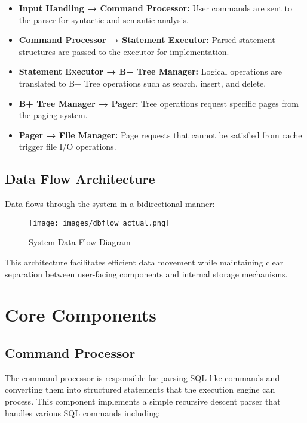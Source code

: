 \documentclass[12pt,a4paper]{article}  %
\begin{document}
\begin{mdframed}[linecolor=uetblue, linewidth=1pt, backgroundcolor=lightgray, roundcorner=10pt, innerleftmargin=10pt, innerrightmargin=10pt]
\begin{itemize}
    \item \textbf{Input Handling → Command Processor:} User commands are sent to the parser for syntactic and semantic analysis.
    
    \item \textbf{Command Processor → Statement Executor:} Parsed statement structures are passed to the executor for implementation.
    
    \item \textbf{Statement Executor → B+ Tree Manager:} Logical operations are translated to B+ Tree operations such as search, insert, and delete.
    
    \item \textbf{B+ Tree Manager → Pager:} Tree operations request specific pages from the paging system.
    
    \item \textbf{Pager → File Manager:} Page requests that cannot be satisfied from cache trigger file I/O operations.
\end{itemize}
\end{mdframed}

\subsection{Data Flow Architecture}

Data flows through the system in a bidirectional manner:

\begin{figure}[H]
\centering
\texttt{[image: images/dbflow\_actual.png]}
\caption{System Data Flow Diagram}
\label{fig:data_flow}
\end{figure}

This architecture facilitates efficient data movement while maintaining clear separation between user-facing components and internal storage mechanisms.

\section{Core Components}

\subsection{Command Processor}
The command processor is responsible for parsing SQL-like commands and converting them into structured statements that the execution engine can process. This component implements a simple recursive descent parser that handles various SQL commands including:
\end{document}
